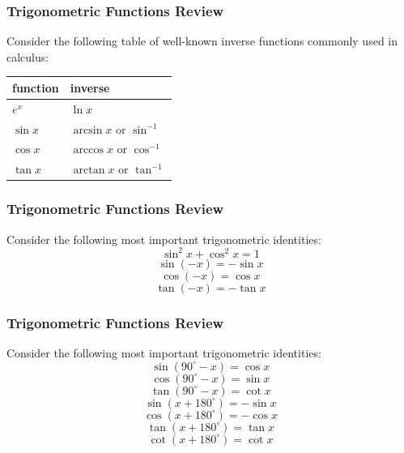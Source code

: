 \documentclass[xcolor=dvipsnames]{beamer}
\begin{document}
\begin{frame}
  \frametitle{Trigonometric Functions Review}
  Consider the following table of well-known inverse functions
  commonly used in calculus:

\bigskip

  \begin{tabular}{|l|l|}\hline
    \textbf{function} & \textbf{inverse} \\ \hline
    $e^{x}$ & $\ln{}x$ \\ \hline
    $\sin{}x$ & $\arcsin{}x\mbox{ or }\sin^{-1}$ \\ \hline
    $\cos{}x$ & $\arccos{}x\mbox{ or }\cos^{-1}$ \\ \hline
    $\tan{}x$ & $\arctan{}x\mbox{ or }\tan^{-1}$ \\ \hline
  \end{tabular}
\end{frame}

\begin{frame}
  \frametitle{Trigonometric Functions Review}
  Consider the following most important trigonometric identities:
  \begin{equation}
    \label{eq:shutooth}
    \sin^{2}x+\cos^{2}x=1
  \end{equation}
\begin{equation}
  \label{eq:iegaexah}
  \sin(-x)=-\sin{}x
\end{equation}
\begin{equation}
  \label{eq:gaijohra}
  \cos(-x)=\cos{}x
\end{equation}
\begin{equation}
  \label{eq:doajeigh}
  \tan(-x)=-\tan{}x
\end{equation}
\end{frame}

\begin{frame}
  \frametitle{Trigonometric Functions Review}
  Consider the following most important trigonometric identities:
\begin{equation}
  \label{eq:dieteipa}
  \sin(90^{\circ}-x)=\cos{}x
\end{equation}
\begin{equation}
  \label{eq:oepoodoh}
  \cos(90^{\circ}-x)=\sin{}x
\end{equation}
\begin{equation}
  \label{eq:aiwatong}
  \tan(90^{\circ}-x)=\cot{}x
\end{equation}
\begin{equation}
  \label{eq:jahpeexu}
  \sin(x+180^{\circ})=-\sin{}x
\end{equation}
\begin{equation}
  \label{eq:aephuemo}
  \cos(x+180^{\circ})=-\cos{}x
\end{equation}
\begin{equation}
  \label{eq:xaiyahcu}
  \tan(x+180^{\circ})=\tan{}x
\end{equation}
\begin{equation}
  \label{eq:aitahwae}
  \cot(x+180^{\circ})=\cot{}x
\end{equation}
\end{frame}
\end{document}
